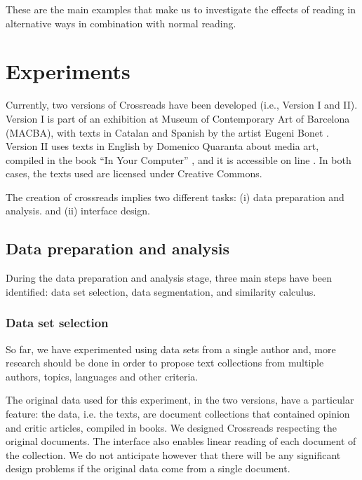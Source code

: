 \documentclass{acm_proc_article-sp}
\begin{document}
These are the main examples that make us to investigate the effects
of reading in alternative ways in combination with normal reading.


\section{Experiments}

Currently, two versions of Crossreads have been developed (i.e., Version I and II).
Version I is part of an exhibition at Museum of Contemporary Art of
Barcelona (MACBA), with texts in Catalan and Spanish by the artist
Eugeni Bonet \cite{crossreads_macba_2014_}. Version II uses texts
in English by Domenico Quaranta about media art, compiled in the book
``In Your Computer'' \cite{quaranta2011your}, and it is accessible
on line \cite{crossreads_quaranta_2014_}. In both cases, the texts
used are licensed under Creative Commons.

The creation of crossreads implies two different tasks: (i) data preparation
and analysis. and (ii) interface design. 


\subsection{Data preparation and analysis}

During the data preparation and analysis stage, three main steps have
been identified: data set selection, data segmentation, and similarity
calculus. 


\subsubsection{Data set selection}

So far, we have experimented using data sets from a single author and, more research should be done in order to propose text collections from multiple authors, topics, languages and other criteria. 

The original data used for this experiment, in the two versions, have a particular feature: the data, i.e. the texts, are document collections that contained opinion and critic articles, compiled in books. We designed Crossreads respecting the original documents.
The interface also enables linear reading of each document of the collection. 
We do not anticipate however that there will be any
significant design problems if the original data come
from a single document.
\end{document}
